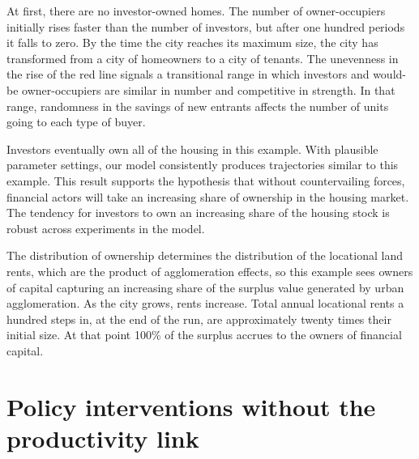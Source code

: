 At first, there are no investor-owned homes. %
The number of owner-occupiers initially rises faster than the number of investors, but after one hundred periods it falls to zero. By the time the city reaches its maximum size, the city has transformed from a city of homeowners to a city of tenants. The unevenness in the rise of the red line signals a transitional range in which investors and would-be owner-occupiers are similar in number and competitive in strength. In that range, randomness in the savings of new entrants affects the number of units going to each type of buyer. 

Investors eventually own all of the housing in this example.  With plausible parameter settings, our model consistently produces trajectories similar to this example. This result supports the hypothesis that without countervailing forces, financial actors will take an increasing share of ownership in the housing market. The tendency for investors to own an increasing share of the housing stock is robust across experiments in the model. 




The distribution of ownership determines the distribution of the locational land rents, which are the product of agglomeration effects, so this example sees owners of capital capturing an increasing share of the surplus value generated by urban agglomeration. %
As the city grows, rents increase. Total annual locational rents a hundred steps in, at the end of the run, are approximately twenty times their initial size. At that point 100\% of the surplus accrues to the owners of financial capital.


\section{Policy interventions without the productivity link}

